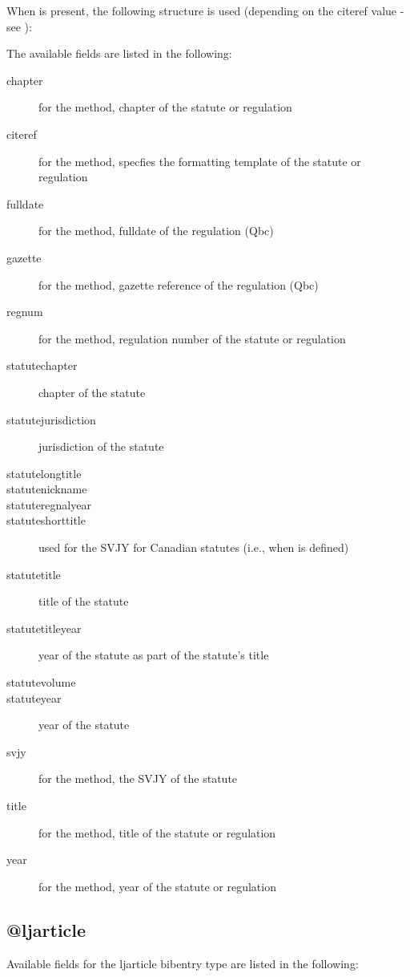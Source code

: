 \p When  is present, the following structure is used (depending on the citeref value - see ):

\begin{quotation}
\end{quotation}

\p The available fields are listed in the following:

\begin{description}
\item[chapter]for the  method, chapter of the statute or regulation
\item[citeref]for the  method, specfies the formatting template of the statute or regulation
\item[fulldate]for the  method, fulldate of the regulation (Qbc)
\item[gazette]for the  method, gazette reference of the regulation (Qbc)
\item[regnum]for the  method, regulation number of the statute or regulation
\item[statutechapter]chapter of the statute
\item[statutejurisdiction]jurisdiction of the statute
\item[statutelongtitle]
\item[statutenickname]
\item[statuteregnalyear]
\item[statuteshorttitle]used for the SVJY for Canadian statutes (i.e., when  is defined)
\item[statutetitle]title of the statute
\item[statutetitleyear]year of the statute as part of the statute’s title
\item[statutevolume]
\item[statuteyear]year of the statute
\item[svjy]for the  method, the SVJY  of the statute
\item[title]for the  method, title of the statute or regulation
\item[year]for the  method, year of the statute or regulation
\end{description}



\subsection{@ljarticle}
\p Available fields for the ljarticle bibentry type are listed in the following:

